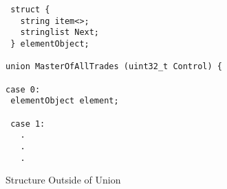 \begin{figure}
\begin{verbatim}
 struct {
   string item<>;
   stringlist Next;
 } elementObject;

union MasterOfAllTrades (uint32_t Control) {

case 0:
 elementObject element;

 case 1:
   .
   .
   .
\end{verbatim}
\caption{Structure Outside of Union}
\label{fig:StructOutsideFigure}
\end{figure}
